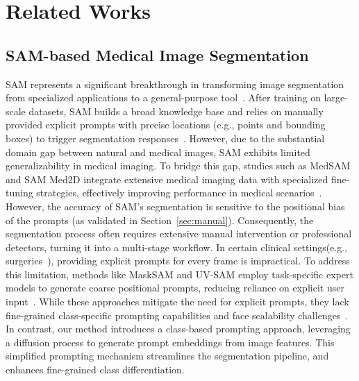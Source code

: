 \section{Related Works}
\subsection{SAM-based Medical Image Segmentation}
SAM represents a significant breakthrough in transforming image segmentation from specialized applications to a general-purpose tool~\cite{MAZUROWSKI2023102918}. 
After training on large-scale datasets, SAM builds a broad knowledge base and relies on manually provided explicit prompts with precise locations (e.g., points and bounding boxes) to trigger segmentation responses~\cite{ZHANG2024108238}. However, due to the substantial domain gap between natural and medical images, SAM exhibits limited generalizability in medical imaging. To bridge this gap, studies such as MedSAM and SAM Med2D integrate extensive medical imaging data with specialized fine-tuning strategies, effectively improving performance in medical scenarios~\cite{ma2024medsam, le2024medficientsam, cheng2023sam2d}. However, the accuracy of SAM’s segmentation is sensitive to the positional bias of the prompts (as validated in Section~\ref{sec:manual}). Consequently, the segmentation process often requires extensive manual intervention or professional detectors, turning it into a multi-stage workflow. In certain clinical settings(e.g., surgeries~\cite{yue2024surgicalsam}), providing explicit prompts for every frame is impractical. To address this limitation, methods like MaskSAM and UV-SAM employ task-specific expert models to generate coarse positional prompts, reducing reliance on explicit user input~\cite{xie2024masksam, zhang2024uv}. While these approaches mitigate the need for explicit prompts, they lack fine-grained class-specific prompting capabilities and face scalability challenges~\cite{paranjape2024adaptivesam, yue2023part}. In contrast, our method introduces a class-based prompting approach, leveraging a diffusion process to generate prompt embeddings from image features. This simplified prompting mechanism streamlines the segmentation pipeline, and enhances fine-grained class differentiation.

